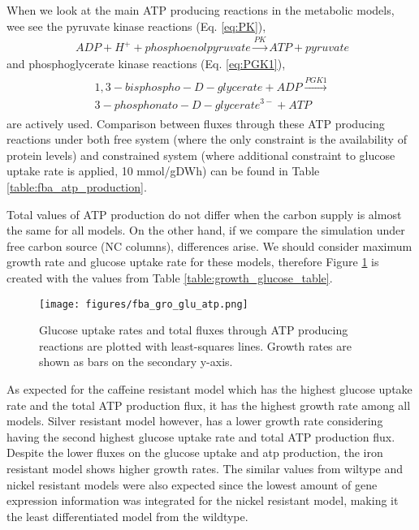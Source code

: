 When we look at the main ATP producing reactions in the metabolic models, wee see the pyruvate kinase reactions (Eq. \ref{eq:PK}),
\begin{align}
\label{eq:PK}
\ ADP + H^+ + phosphoenolpyruvate \xrightarrow{PK} ATP + pyruvate
\end{align}
and phosphoglycerate kinase reactions (Eq. \ref{eq:PGK1}),
\begin{align}
\begin{split}
\label{eq:PGK1}
\ 1,3-bisphospho-D-glycerate + ADP  \xrightarrow{PGK1} \\
\ 3-phosphonato-D-glycerate^{3-} + ATP
\end{split}
\end{align}
are actively used. Comparison between fluxes through these ATP producing reactions under both free system (where the only constraint is the availability of protein levels) and constrained system (where additional constraint to glucose uptake rate is applied, 10 mmol/gDWh) can be found in Table \ref{table:fba_atp_production}.

\baselineskip


Total values of ATP production do not differ when the carbon supply is almost the same for all models. On the other hand, if we compare the simulation under free carbon source (NC columns), differences arise. We should consider maximum growth rate and glucose uptake rate for these models, therefore Figure \ref{fig:fba_gro_glu_atp} is created with the values from Table \ref{table:growth_glucose_table}.

\begin{figure}[H]
  \begin{center}
  \texttt{[image: figures/fba\_gro\_glu\_atp.png]}
  \caption[Glucose uptake rates and total fluxes through ATP producing reactions are plotted with least-squares lines. Growth rates are shown as bar graphs.]{Glucose uptake rates and total fluxes through ATP producing reactions are plotted with least-squares lines. Growth rates are shown as bars on the secondary y-axis.}
  \label{fig:fba_gro_glu_atp}
  \end{center}
\end{figure}

As expected for the caffeine resistant model which has the highest glucose uptake rate and the total ATP production flux, it has the highest growth rate among all models. Silver resistant model however, has a lower growth rate considering having the second highest glucose uptake rate and total ATP production flux. Despite the lower fluxes on the glucose uptake and atp production, the iron resistant model shows higher growth rates. The similar values from wiltype and nickel resistant models were also expected since the lowest amount of gene expression information was integrated for the nickel resistant model, making it the least differentiated model from the wildtype.

